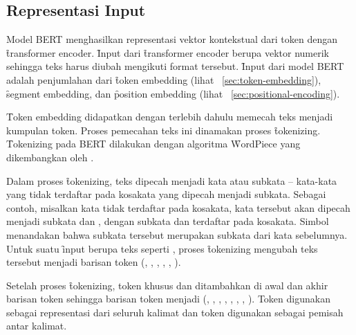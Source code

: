 \subsection{Representasi Input}
\label{sec:bert-input-representation}

Model BERT menghasilkan representasi vektor kontekstual dari token dengan \f{transformer encoder}. \f{Input} dari \f{transformer encoder} berupa vektor numerik sehingga teks harus diubah mengikuti format tersebut. \f{Input} dari model BERT adalah penjumlahan dari \f{token embedding} (lihat \sect~\ref{sec:token-embedding}), \f{segment embedding}, dan \f{position embedding} (lihat \sect~\ref{sec:positional-encoding}).

\f{Token embedding} didapatkan dengan terlebih dahulu memecah teks menjadi kumpulan token. Proses pemecahan teks ini dinamakan proses \f{tokenizing}. \f{Tokenizing} pada BERT dilakukan dengan algoritma \f{WordPiece} yang dikembangkan oleh \cite{tokenizer}.

Dalam proses \f{tokenizing}, teks dipecah menjadi kata atau subkata -- kata-kata yang tidak terdaftar pada kosakata yang dipecah menjadi subkata. Sebagai contoh, misalkan kata  tidak terdaftar pada kosakata, kata tersebut akan dipecah menjadi subkata  dan , dengan subkata  dan  terdaftar pada kosakata. Simbol \code{\#\#} menandakan bahwa subkata tersebut merupakan subkata dari kata sebelumnya. Untuk suatu \f{input} berupa teks seperti , proses \f{tokenizing} mengubah teks tersebut menjadi barisan token (, , , , , ). 

Setelah proses \f{tokenizing}, token khusus \code{[CLS]} dan \code{[SEP]} ditambahkan di awal dan akhir barisan token sehingga barisan token menjadi (\code{[CLS]}, , , , , , , \code{[SEP]}). Token \code{[CLS]} digunakan sebagai representasi dari seluruh kalimat dan token \code{[SEP]} digunakan sebagai pemisah antar kalimat.

